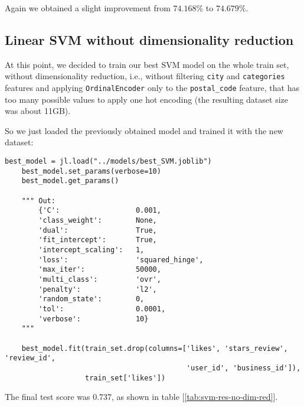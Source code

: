 Again we obtained a slight improvement from $74.168\%$ to $74.679\%$.


\newpage
\subsection{Linear SVM without dimensionality reduction} \label{sec:svm-no-dim-red}

At this point, we decided to train our best SVM model on the whole train set, without dimensionality reduction, i.e., without filtering \texttt{city} and \texttt{categories} features and applying \texttt{OrdinalEncoder} only to the \texttt{postal\_code} feature, that has too many possible values to apply one hot encoding (the resulting dataset size was about 11GB).

So we just loaded the previously obtained model and trained it with the new dataset:

\begin{lstlisting}[caption={SVM without dimensionality reduction},label={lst:svm-no-dim-red}]
    best_model = jl.load("../models/best_SVM.joblib")
    best_model.set_params(verbose=10)
    best_model.get_params()
    
    """ Out:
        {'C':                  0.001,
        'class_weight':        None,
        'dual':                True,
        'fit_intercept':       True,
        'intercept_scaling':   1,
        'loss':                'squared_hinge',
        'max_iter':            50000,
        'multi_class':         'ovr',
        'penalty':             'l2',
        'random_state':        0,
        'tol':                 0.0001,
        'verbose':             10}
    """
    
    best_model.fit(train_set.drop(columns=['likes', 'stars_review', 'review_id',
                                           'user_id', 'business_id']), 
                   train_set['likes'])
\end{lstlisting}

The final test score was 0.737, as shown in table [\ref{tab:svm-res-no-dim-red}].

